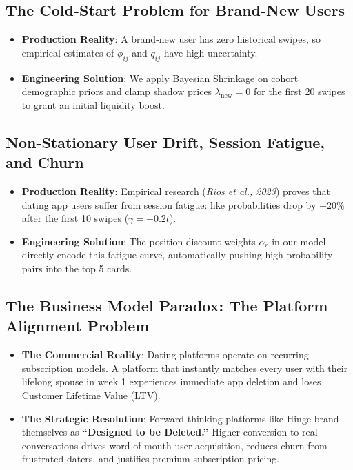 \documentclass[11pt,letterpaper]{article}
\theoremstyle{definition}
\theoremstyle{plain}
\theoremstyle{remark}
\begin{document}
\subsection{The Cold-Start Problem for Brand-New Users}
\begin{itemize}[leftmargin=1.5em]
    \item \textbf{Production Reality}: A brand-new user has zero historical swipes, so empirical estimates of $\phi_{ij}$ and $q_{ij}$ have high uncertainty.
    \item \textbf{Engineering Solution}: We apply Bayesian Shrinkage on cohort demographic priors and clamp shadow prices $\lambda_{\text{new}} = 0$ for the first 20 swipes to grant an initial liquidity boost.
\end{itemize}

\subsection{Non-Stationary User Drift, Session Fatigue, and Churn}
\begin{itemize}[leftmargin=1.5em]
    \item \textbf{Production Reality}: Empirical research (\emph{Rios et al., 2023}) proves that dating app users suffer from session fatigue: like probabilities drop by $-20\%$ after the first 10 swipes ($\gamma = -0.2 t$).
    \item \textbf{Engineering Solution}: The position discount weights $\alpha_r$ in our model directly encode this fatigue curve, automatically pushing high-probability pairs into the top 5 cards.
\end{itemize}

\subsection{The Business Model Paradox: The Platform Alignment Problem}
\begin{itemize}[leftmargin=1.5em]
    \item \textbf{The Commercial Reality}: Dating platforms operate on recurring subscription models. A platform that instantly matches every user with their lifelong spouse in week 1 experiences immediate app deletion and loses Customer Lifetime Value (LTV).
    \item \textbf{The Strategic Resolution}: Forward-thinking platforms like Hinge brand themselves as \textbf{``Designed to be Deleted.''} Higher conversion to real conversations drives word-of-mouth user acquisition, reduces churn from frustrated daters, and justifies premium subscription pricing.
\end{itemize}
\end{document}

